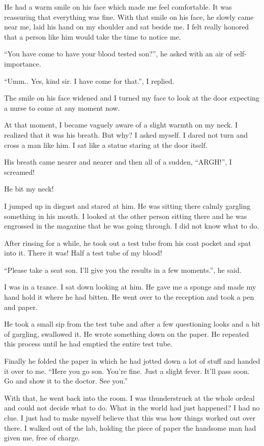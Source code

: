 \documentclass[twoside,11pt,titlepage]{article}
\begin{document}
He had a warm smile on his face which made me feel comfortable. It was reassuring that everything was fine. With that smile on his face, he slowly came near me, laid his hand on my shoulder and sat beside me. I felt really honored that a person like him would take the time to notice me.

``You have come to have your blood tested son?'', he asked with an air of self-importance.

``Umm.. Yes, kind sir. I have come for that.'', I replied.

The smile on his face widened and I turned my face to look at the door expecting a nurse to come at any moment now.

At that moment, I became vaguely aware of a slight warmth on my neck. I realized that it was his breath. But why? I asked myself. I dared not turn and cross a man like him. I sat like a statue staring at the door itself.

His breath came nearer and nearer and then all of a sudden, ``ARGH!'', I screamed!

He bit my neck!

I jumped up in disgust and stared at him. He was sitting there calmly gargling something in his mouth. I looked at the other person sitting there and he was engrossed in the magazine that he was going through. I did not know what to do.

After rinsing for a while, he took out a test tube from his coat pocket and spat into it. There it was! Half a test tube of my blood!

``Please take a seat son. I'll give you the results in a few moments.'', he said.

I was in a trance. I sat down looking at him. He gave me a sponge and made my hand hold it where he had bitten. He went over to the reception and took a pen and paper.

He took a small sip from the test tube and after a few questioning looks and a bit of gargling, swallowed it. He wrote something down on the paper. He repeated this process until he had emptied the entire test tube.

Finally he folded the paper in which he had jotted down a lot of stuff and handed it over to me. ``Here you go son. You're fine. Just a slight fever. It'll pass soon. Go and show it to the doctor. See you.''

With that, he went back into the room. I was thunderstruck at the whole ordeal and could not decide what to do. What in the world had just happened? I had no clue. I just had to make myself believe that this was how things worked out over there. I walked out of the lab, holding the piece of paper the handsome man had given me, free of charge.
\end{document}
